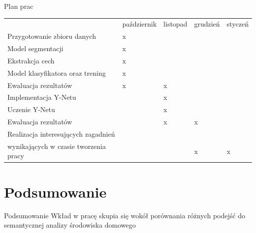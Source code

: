 \documentclass[10pt]{beamer}
\begin{document}
\begin{frame}{Plan prac}
    \begin{table}[]

        \begin{adjustbox}{width=\columnwidth,center}
        \begin{tabular}{lllll}
                                                                                & październik & listopad & grudzień & styczeń \\
        Przygotowanie zbioru danych                                                & x           &          &          &         \\ \hline
        Model segmentacji                                                          & x           &          &          &         \\ \hline
        Ekstrakcja cech                                                            & x           &          &          &         \\ \hline
        Model klasyfikatora oraz trening                                           & x           &          &          &         \\ \hline
        Ewaluacja rezultatów                                                       & x           & x        &          &         \\ \hline \hline
        Implementacja Y-Netu                                                       &             & x        &          &         \\ \hline
        Uczenie Y-Netu                                                             &             & x        &          &         \\ \hline
        Ewaluacja rezultatów                                                       &             & x        & x        &         \\ \hline
        Realizacja interesujących zagadnień\\ wynikających w czasie tworzenia pracy &             &          & x        & x      
        \end{tabular}
        \end{adjustbox}
        \end{table}
\end{frame}
\section[Podsumowanie]{Podsumowanie}
\begin{frame}{Podsumowanie}
    Wkład w pracę skupia się wokół porównania różnych podejść do semantycznej analizy środowiska domowego
\end{frame}
\end{document}
